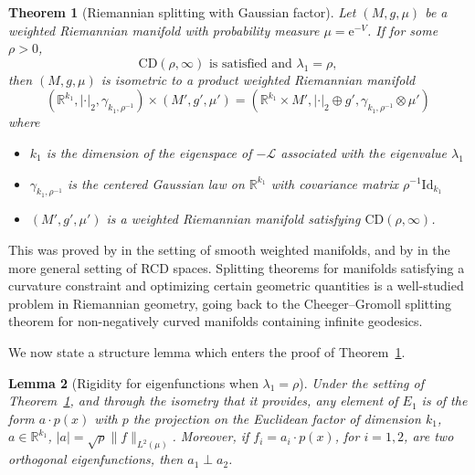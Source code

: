 \documentclass[10pt,reqno]{amsart}
\newtheorem{theorem}{Theorem}[section]
\newtheorem{lemma}[theorem]{Lemma}
\numberwithin{equation}{section}
\begin{document}
\begin{theorem}[Riemannian splitting with Gaussian
  factor] \label{thm_split_cz} Let $(M, g, \mu)$ be a weighted Riemannian
  manifold with probability measure $\mu=\mathrm{e}^{-V}$. If for some
  $\rho>0$,
  \begin{equation}
  \text{$\mathrm{CD}(\rho, \infty)$ is satisfied and $\lambda_1=\rho$}, 
  \end{equation}
  then $(M,g, \mu)$ is isometric to a product weighted Riemannian manifold 
  \begin{equation}
    (\mathbb{R}^{k_1},\left|\cdot\right|_2,\gamma_{k_1,\rho^{-1}})\times (M',g',\mu')
    =(\mathbb{R}^{k_1} \times M',\left|\cdot\right|_2 \oplus g', \gamma_{k_1,\rho^{-1}} \otimes \mu')
  \end{equation}
  where 
  \begin{itemize}
  \item $k_1$ is the dimension of the eigenspace of $-\mathcal{L}$ associated with the eigenvalue $\lambda_1$
  \item $\gamma_{k_1,\rho^{-1}}$ is the centered Gaussian law on
    $\mathbb{R}^{k_1}$ with covariance matrix $\rho^{-1}\mathrm{Id}_{k_1}$
  \item $(M', g', \mu')$ is a weighted Riemannian manifold satisfying $\mathrm{CD}(\rho, \infty)$.
  \end{itemize}
\end{theorem}

This was proved by \cite{CZ17} in the setting
of smooth weighted manifolds, and by \cite{GKKO20} in the more general setting
of RCD spaces. Splitting theorems for manifolds satisfying a curvature
constraint and optimizing certain geometric quantities is a well-studied
problem in Riemannian geometry, going back to the Cheeger--Gromoll
splitting theorem for non-negatively curved manifolds containing infinite
geodesics.

We now state a structure lemma which enters the proof of Theorem~\ref{thm_split_cz}. %

\begin{lemma}[Rigidity for eigenfunctions when $\lambda_1 =
  \rho$] \label{lem_rig} Under the setting of Theorem~\ref{thm_split_cz}, and
  through the isometry that it provides, any element of $E_1$ is of the form
  $a \cdot p(x) $ with $p$ the projection on the Euclidean factor of dimension
  $k_1$, $a \in \mathbb{R}^{k_1}$, $|a| = \sqrt{\rho}\|f\|_{L^2(\mu)}$. Moreover, if
  $f_i = a_i \cdot p(x)$, for $i=1,2$, are two orthogonal eigenfunctions, then
  $a_1\perp a_2$.
\end{lemma}
\end{document}
